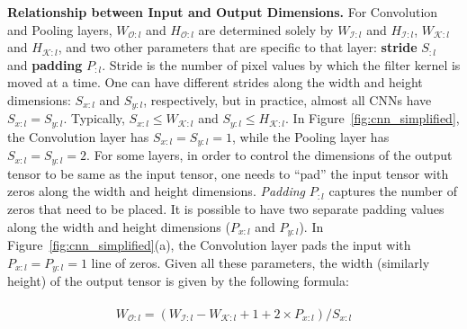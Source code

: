 
\vspace{2mm}
\noindent \textbf{Relationship between Input and Output Dimensions.}
For Convolution and Pooling layers, $W_{\mathcal{O}:l}$ and $H_{\mathcal{O}:l}$ are determined solely by $W_{\mathcal{I}:l}$ and $H_{\mathcal{I}:l}$, $W_{\mathcal{K}:l}$ and $H_{\mathcal{K}:l}$, and two other parameters that are specific to that layer: \textbf{stride} $S_{:l}$ and \textbf{padding} $P_{:l}$. Stride is the number of pixel values by which the filter kernel is moved at a time. One can have different strides along the width and height dimensions: $S_{x:l}$ and $S_{y:l}$, respectively, but in practice, almost all CNNs have $S_{x:l} = S_{y:l}$. Typically, $S_{x:l} \leq W_{\mathcal{K}:l}$ and $S_{y:l} \leq H_{\mathcal{K}:l}$. In Figure~\ref{fig:cnn_simplified}, the Convolution layer has $S_{x:l} = S_{y:l} = 1$, while the Pooling layer has $S_{x:l} = S_{y:l} = 2$. For some layers, in order to control the dimensions of the output tensor to be same as the input tensor, one needs to ``pad'' the input tensor with zeros along the width and height dimensions. \textit{Padding} $P_{:l}$ captures the number of zeros that need to be placed. It is possible to have two separate padding values along the width and height dimensions ($P_{x:l}$ and $P_{y:l}$). In Figure~\ref{fig:cnn_simplified}(a), the Convolution layer pads the input with $P_{x:l} = P_{y:l} = 1$ line of zeros. Given all these parameters, the width (similarly height) of the output tensor is given by the following formula:

\vspace{-4mm}
\begin{align}
\begin{split}
W_{\mathcal{O}:l} = (W_{\mathcal{I}:l} - W_{\mathcal{K}:l} + 1 + 2\times P_{x:l})/S_{x:l} \\
\end{split}
\end{align}


